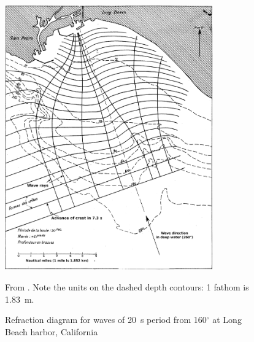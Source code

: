 \begin{figure}
\centerline{\includegraphics[width=0.8\textwidth]{FIGS_CH_SHALLOWLIN/Long_Beach.pdf}}
  \caption{Refraction diagram for waves of 20~s period from 160$^\circ$ at Long Beach harbor, California}{From \cite{Lacombe1950}. 
  Note the units on the dashed depth contours: 1 fathom is 1.83~m.  }
   \label{RaysLongBeach}
  \end{figure}

